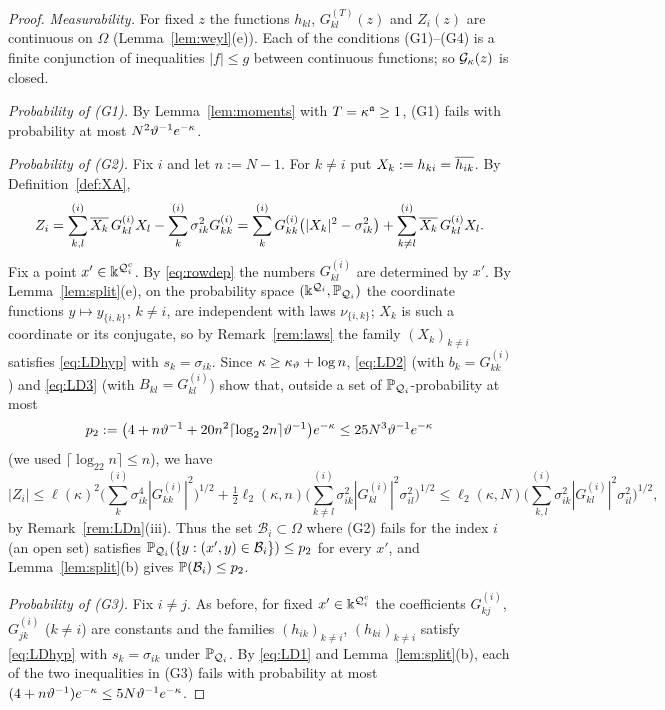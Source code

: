 \begin{proof}
\emph{Measurability.} For fixed $z$ the functions $h_{kl}$, $G^{(T)}_{kl}(z)$ and $Z_i(z)$ are continuous on $\Omega$ (Lemma~\ref{lem:weyl}(e)). Each of the conditions (G1)--(G4) is a finite conjunction of inequalities $|f|\le g$ between continuous functions; so $\mathcal{G}_\kappa(z)$ is closed.

\emph{Probability of \textup{(G1)}.} By Lemma~\ref{lem:moments} with $T=\kappa^{\mathfrak{a}}\ge1$, (G1) fails with probability at most $N^2\vartheta^{-1}e^{-\kappa}$.

\emph{Probability of \textup{(G2)}.} Fix $i$ and let $n:=N-1$. For $k\ne i$ put $X_k:=h_{ki}=\overline{h_{ik}}$. By Definition~\ref{def:XA},
\[
 Z_i=\sum^{(i)}_{k,l}\overline{X_k}\,G^{(i)}_{kl}X_l-\sum^{(i)}_k\sigma_{ik}^2G^{(i)}_{kk}=\sum^{(i)}_kG^{(i)}_{kk}\big(|X_k|^2-\sigma_{ik}^2\big)+\sum^{(i)}_{k\ne l}\overline{X_k}\,G^{(i)}_{kl}X_l .
\]
Fix a point $x'\in\Bbbk^{\mathcal Q_i^c}$. By \eqref{eq:rowdep} the numbers $G^{(i)}_{kl}$ are determined by $x'$. By Lemma~\ref{lem:split}(e), on the probability space $(\Bbbk^{\mathcal Q_i},\mathbb{P}_{\mathcal Q_i})$ the coordinate functions $y\mapsto y_{\{i,k\}}$, $k\ne i$, are independent with laws $\nu_{\{i,k\}}$;
$X_k$ is such a coordinate or its conjugate, so by Remark~\ref{rem:laws} the family $(X_k)_{k\ne i}$ satisfies \eqref{eq:LDhyp} with $s_k=\sigma_{ik}$. Since $\kappa\ge\kappa_\vartheta+\log n$, \eqref{eq:LD2} (with $b_k=G^{(i)}_{kk}$) and \eqref{eq:LD3} (with $B_{kl}=G^{(i)}_{kl}$) show that, outside a set of $\mathbb{P}_{\mathcal Q_i}$-probability at most
\[
 p_2:=\big(4+n\vartheta^{-1}+20n^2\lceil\log_22n\rceil\vartheta^{-1}\big)e^{-\kappa}\le25N^3\vartheta^{-1}e^{-\kappa}
\]
(we used $\lceil\log_22n\rceil\le n$), we have
\[
 |Z_i|\le\ell(\kappa)^2\Big(\sum^{(i)}_k\sigma_{ik}^4|G^{(i)}_{kk}|^2\Big)^{1/2}+\tfrac12\ell_2(\kappa,n)\Big(\sum^{(i)}_{k\ne l}\sigma_{ik}^2|G^{(i)}_{kl}|^2\sigma_{il}^2\Big)^{1/2}\le\ell_2(\kappa,N)\Big(\sum^{(i)}_{k,l}\sigma_{ik}^2|G^{(i)}_{kl}|^2\sigma_{il}^2\Big)^{1/2},
\]
by Remark~\ref{rem:LDn}(iii). Thus the set $\mathcal B_i\subset\Omega$ where (G2) fails for the index $i$ (an open set) satisfies $\mathbb{P}_{\mathcal Q_i}(\{y:(x',y)\in\mathcal B_i\})\le p_2$ for every $x'$, and Lemma~\ref{lem:split}(b) gives $\mathbb{P}(\mathcal B_i)\le p_2$.

\emph{Probability of \textup{(G3)}.} Fix $i\ne j$. As before, for fixed $x'\in\Bbbk^{\mathcal Q_i^c}$ the coefficients $G^{(i)}_{kj}$, $G^{(i)}_{jk}$ ($k\ne i$) are constants and the families $(h_{ik})_{k\ne i}$, $(h_{ki})_{k\ne i}$ satisfy \eqref{eq:LDhyp} with $s_k=\sigma_{ik}$ under $\mathbb{P}_{\mathcal Q_i}$. By \eqref{eq:LD1} and Lemma~\ref{lem:split}(b),
each of the two inequalities in (G3) fails with probability at most $(4+n\vartheta^{-1})e^{-\kappa}\le5N\vartheta^{-1}e^{-\kappa}$.


\end{proof}
